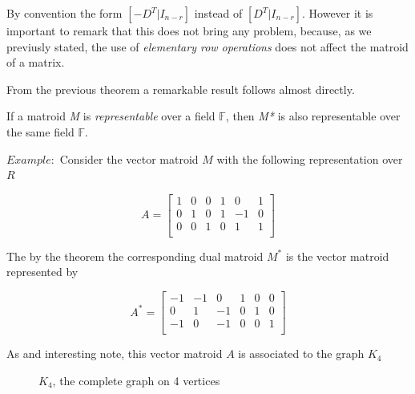 By convention the form $[-D^T |I_{n-r}]$ instead of $[D^T |I_{n-r}]$. However it is important to remark that this does not bring any problem, because, as we previusly stated, the use of \textit{elementary row operations} does not affect the matroid of a matrix. 

From the previous theorem a remarkable result follows almost directly. 

\begin{corollary} \label{corollaryrepdual}
    If a matroid \textit{M} is \textit{representable} over a field $\mathbb{F}$, then \textit{M*} is also representable over the same field $\mathbb{F}$.
\end{corollary}



$Example:$ Consider the vector matroid $M$ with the following representation over $R$
        \begin{figure}[H]
            $$A = \begin{bmatrix}
                1 & 0 & 0 & 1 & 0 & 1 \\
                0 & 1 & 0 & 1 & -1 & 0 \\
                0 & 0 & 1 & 0 & 1 & 1 \\
            \end{bmatrix}$$
        \end{figure}
        
The by the theorem the corresponding dual matroid $M^*$ is the vector matroid represented by 
        \begin{figure}[H]
            $$A^* = \begin{bmatrix}
                -1 & -1 & 0 & 1 & 0 & 0 \\
                0 & 1 & -1 & 0 & 1 & 0 \\
                -1 & 0 & -1 & 0 & 0 & 1 \\
            \end{bmatrix}$$
        \end{figure}
As and interesting note, this vector matroid $A$ is associated to the graph $K_4$ 
       \begin{figure}[H]
        \centering
            \caption{$K_4$, the complete graph on 4 vertices}
            \label{fig:enter-label}
        \end{figure}

